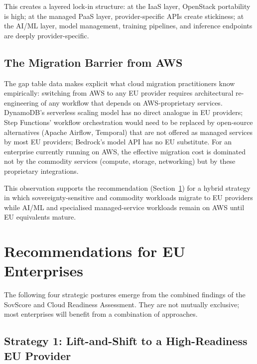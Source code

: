 This creates a layered lock-in structure: at the IaaS layer, OpenStack portability is high; at the managed PaaS layer, provider-specific APIs create stickiness; at the AI/ML layer, model management, training pipelines, and inference endpoints are deeply provider-specific.

\subsection{The Migration Barrier from AWS}

The gap table data makes explicit what cloud migration practitioners know empirically: switching from AWS to any EU provider requires architectural re-engineering of any workflow that depends on AWS-proprietary services. DynamoDB's serverless scaling model has no direct analogue in EU providers; Step Functions' workflow orchestration would need to be replaced by open-source alternatives (Apache Airflow, Temporal) that are not offered as managed services by most EU providers; Bedrock's model API has no EU substitute. For an enterprise currently running on AWS, the effective migration cost is dominated not by the commodity services (compute, storage, networking) but by these proprietary integrations.

This observation supports the recommendation (Section~\ref{sec:enterprise_recommendations}) for a hybrid strategy in which sovereignty-sensitive and commodity workloads migrate to EU providers while AI/ML and specialised managed-service workloads remain on AWS until EU equivalents mature.

\section{Recommendations for EU Enterprises}
\label{sec:enterprise_recommendations}

The following four strategic postures emerge from the combined findings of the SovScore and Cloud Readiness Assessment. They are not mutually exclusive; most enterprises will benefit from a combination of approaches.

\subsection{Strategy 1: Lift-and-Shift to a High-Readiness EU Provider}

